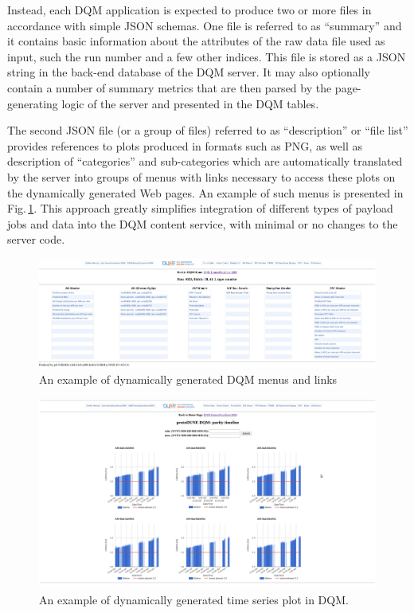 \documentclass{webofc}
\begin{document}
Instead, each DQM application is expected to produce two or more files in accordance
with simple JSON schemas. One file is referred to as ``summary'' and it contains basic
information about the attributes of the raw data file used as input, such the run number
and a few other indices. This file is stored as a JSON string in the back-end database
of the DQM server. It may also optionally contain a number of summary metrics
that are then parsed by the page-generating logic of the server and presented
in the DQM tables.

The second JSON file (or a group of files) referred to as ``description'' or ``file list'' provides references to
plots produced in formats such as PNG, as well as description of ``categories''
and sub-categories which are automatically translated by the server into
groups of menus with links necessary to access these plots on the dynamically generated
Web pages. An example of such menus is presented in Fig.\,\ref{fig:tpc_monitor}.
This approach greatly simplifies integration of different types of payload jobs 
and data into the DQM content service, with minimal or no changes to the
server code.

\begin{figure}[tb]
\centering\includegraphics[width=1.0\textwidth]{figures/tpc_monitor_2018_v1.png}
\caption{\label{fig:tpc_monitor}An example of dynamically generated DQM menus and links}
\end{figure}


\begin{figure}[tb]
\centering\includegraphics[width=1.0\textwidth]{figures/purity_chart_2018_v1.png}
\caption{\label{fig:purity_chart}An example of dynamically generated time series plot in DQM.}
\end{figure}
\end{document}
